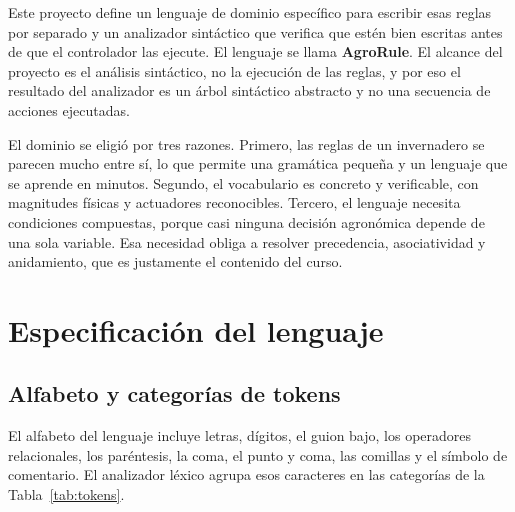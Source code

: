 \documentclass[11pt,letterpaper]{article}
\begin{document}
Este proyecto define un lenguaje de dominio específico para escribir esas reglas por separado y un analizador sintáctico que verifica que estén bien escritas antes de que el controlador las ejecute. El lenguaje se llama \textbf{AgroRule}. El alcance del proyecto es el análisis sintáctico, no la ejecución de las reglas, y por eso el resultado del analizador es un árbol sintáctico abstracto y no una secuencia de acciones ejecutadas.

El dominio se eligió por tres razones. Primero, las reglas de un invernadero se parecen mucho entre sí, lo que permite una gramática pequeña y un lenguaje que se aprende en minutos. Segundo, el vocabulario es concreto y verificable, con magnitudes físicas y actuadores reconocibles. Tercero, el lenguaje necesita condiciones compuestas, porque casi ninguna decisión agronómica depende de una sola variable. Esa necesidad obliga a resolver precedencia, asociatividad y anidamiento, que es justamente el contenido del curso.

\section{Especificación del lenguaje}

\subsection{Alfabeto y categorías de tokens}

El alfabeto del lenguaje incluye letras, dígitos, el guion bajo, los operadores relacionales, los paréntesis, la coma, el punto y coma, las comillas y el símbolo de comentario. El analizador léxico agrupa esos caracteres en las categorías de la Tabla~\ref{tab:tokens}.
\end{document}

